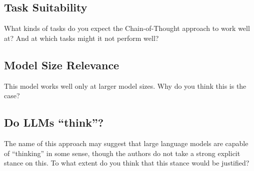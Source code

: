 \documentclass[
10pt, %
a4paper, %
oneside, %
headinclude,footinclude, %
BCOR5mm, %
]{scrartcl}
\begin{document}
\subsection{Task Suitability}
What kinds of tasks do you expect the Chain-of-Thought approach to work well at? And at which tasks might it not perform well?

\subsection{Model Size Relevance}
This model works well only at larger model sizes. Why do you think this is the case?

\subsection{Do LLMs ``think''?}
The name of this approach may suggest that large language models are capable of ``thinking'' in some sense, though the authors do not take a strong explicit stance on this. To what extent do you think that this stance would be justified?


\renewcommand{\refname}{\spacedlowsmallcaps{References}} %




\end{document}
